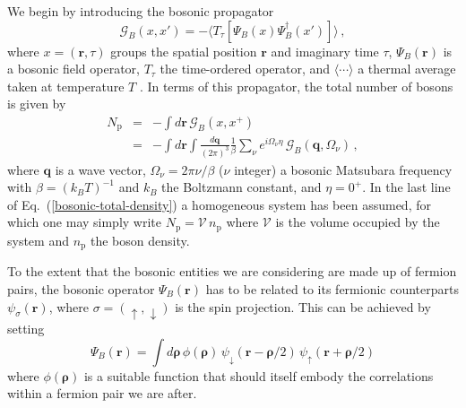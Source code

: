 \documentclass[pra,twocolumn,aps,amssymb,showpacs,superscriptaddress]{revtex4-1}
\begin{document}
We begin by introducing the bosonic propagator
\begin{equation}
\mathcal{G}_{B}(x,x')  =  - \langle T_{\tau}[\Psi_{B}(x) \Psi^{\dagger}_{B}(x')] \rangle \, ,
\label{defin-G}
\end{equation}
where $x=(\mathbf{r},\tau)$ groups the spatial position $\mathbf{r}$ and imaginary time $\tau$, $\Psi_{B}(\mathbf{r})$ is a bosonic field operator, $T_{\tau}$ the time-ordered operator, and
$\langle \cdots \rangle$ a thermal average taken at temperature $T$ \cite{FW-1971}.
In terms of this propagator, the total number of bosons is given by
\begin{eqnarray}
N_{\mathrm{p}} & = & - \int \! d\mathbf{r} \, \mathcal{G}_{B}(x,x^{+})
\nonumber \\
& = & - \int \! d\mathbf{r} \! \int \! \frac{d\mathbf{q}}{(2 \pi)^{3}} \frac{1}{\beta} \sum_{\nu} e^{i \Omega_{\nu} \eta} \, \mathcal{G}_{B}(\mathbf{q},\Omega_{\nu}) \, ,
\label{bosonic-total-density}
\end{eqnarray}
\noindent
where $\mathbf{q}$ is a wave vector, $\Omega_{\nu} = 2 \pi \nu / \beta$ ($\nu$ integer) a bosonic Matsubara frequency with $\beta = (k_{B} T)^{-1}$ and $k_{B}$ the
Boltzmann constant, and $\eta = 0^{+}$.
In the last line of Eq.~(\ref{bosonic-total-density}) a homogeneous system has been assumed, for which one may simply write $N_{\mathrm{p}} = \mathcal{V} \, n_{\mathrm{p}}$ where
$\mathcal{V}$ is the volume occupied by the system and $n_{\mathrm{p}}$ the boson density.

To the extent that the bosonic entities we are considering are made up of fermion pairs, the bosonic operator $\Psi_{B}({\mathbf r})$ has to be related to its fermionic counterparts
$\psi_{\sigma}({\mathbf r})$, where $\sigma = (\uparrow,\downarrow)$ is the spin projection.
This can be achieved by setting
\begin{equation}
\Psi_{B}({\mathbf r}) = \int \! d\boldsymbol{\rho} \, \phi(\boldsymbol{\rho}) \, \psi_{\downarrow}({\mathbf r}-\boldsymbol{\rho}/2) \, \psi_{\uparrow}({\mathbf r}+\boldsymbol{\rho}/2)
\label{definition-boson-fermion}
\end{equation}
where $\phi(\boldsymbol{\rho})$ is a suitable function that should itself embody the correlations within a fermion pair we are after.
\end{document}
